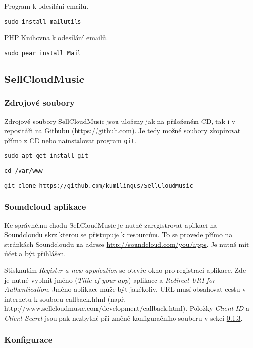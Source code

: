 \documentclass[12pt]{article}
\begin{document}
Program k odesílání emailů.\newline

\texttt{sudo install mailutils}\newline

PHP Knihovna k odesílání emailů.\newline

\texttt{sudo pear install Mail}

\subsection{SellCloudMusic}

\subsubsection{Zdrojové soubory}

Zdrojové soubory SellCloudMusic jsou uloženy jak na přiloženém CD, tak i v repositáři na Githubu (\url{https://github.com}). Je tedy možné soubory zkopírovat přímo z CD nebo nainstalovat program \texttt{git}.\newline

\texttt{sudo apt-get install git}

\texttt{cd /var/www}

\texttt{git clone https://github.com/kumilingus/SellCloudMusic}

\subsubsection{Soundcloud aplikace} \label{scapp}

Ke správnému chodu SellCloudMusic je nutné zaregistrovat aplikaci na Soundcloudu skrz kterou se přistupuje k resourcům. To se provede přímo na stránkách Soundcloudu na adrese \url{http://soundcloud.com/you/apps}. Je nutné mít účet a být přihlášen.

Stisknutím \emph{Register a new application} se otevře okno pro registraci aplikace. Zde je nutné vyplnit jméno (\emph{Title of your app}) aplikace  a \emph{Redirect URI for Authentication}. Jméno aplikace může být jakékoliv, URL musí obsahovat cestu v internetu k souboru callback.html (např. http://www.sellcloudmusic.com/development/callback.html).
Položky  \emph{Client ID} a \emph{Client Secret} jsou pak nezbytné při změně konfiguračního souboru v sekci \ref{scmconf}.

\subsubsection{Konfigurace} \label{scmconf}
\end{document}
